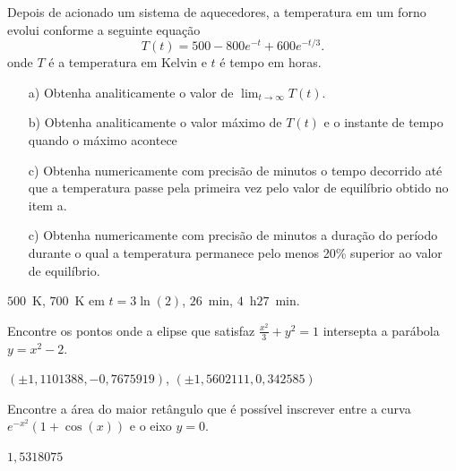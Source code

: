 \begin{Exercise}[title=Controle de sistemas]  Depois de acionado um sistema de aquecedores, a temperatura em um forno  evolui conforme a seguinte equação
$$T(t)=500-800e^{-t}+600e^ {-t/3}.$$
onde $T$ é a temperatura em Kelvin e $t$ é tempo em horas.
\begin{itemize}
\item[a)] Obtenha analiticamente o valor de $\lim_{t\to\infty}T(t)$.
\item[b)] Obtenha analiticamente o valor máximo de $T(t)$ e o instante de tempo quando o máximo acontece
\item[c)] Obtenha numericamente com precisão de minutos o tempo decorrido até que a temperatura passe pela primeira vez pelo valor de equilíbrio obtido no item a.
\item[c)] Obtenha numericamente com precisão de minutos a duração do período durante o qual a temperatura permanece pelo menos 20\% superior ao valor de equilíbrio.
\end{itemize}
\end{Exercise}

\begin{Answer}
  \begin{tiny}
$500$~K, $700$~K em $t=3\ln(2)$, $26$~min, $4$~h$27$~min.    
  \end{tiny}
\end{Answer}

\begin{Exercise} Encontre os pontos onde a elipse que satisfaz $\frac{x^2}{3}+y^2=1$ intersepta a parábola $y=x^2-2$.
\end{Exercise}
\begin{Answer}
  \begin{tiny}
$\left(\pm 1,1101388, -0,7675919\right)$, $\left(\pm 1,5602111, 0,342585\right)$
  \end{tiny}
\end{Answer}

\begin{Exercise}[title= Otimização] Encontre a área do maior retângulo que é possível inscrever entre a curva $e^{-x^2}\left(1+\cos(x)\right)$ e o eixo $y=0$.
\end{Exercise}
\begin{Answer}
  \begin{tiny}
$1,5318075$
  \end{tiny}
\end{Answer}


